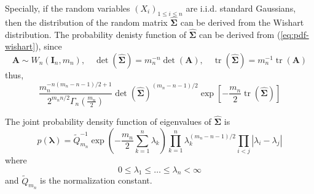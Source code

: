 Specially, if the random variables $\left(X_{i}\right)_{1\leq i\leq n}$ are i.i.d. standard Gaussians, then the distribution of the random matrix $\widehat{\boldsymbol{\Sigma}}$ can be derived from the Wishart distribution. The probability denisty function of $\widehat{\boldsymbol{\Sigma}}$ can be derived from (\ref{eq:pdf-wishart}), since
\begin{equation*}
    \mathbf{A}\sim W_{n}\left(\mathbf{I}_{n},m_{n}\right),\quad\operatorname{det}\left(\widehat{\boldsymbol{\Sigma}}\right)=m_{n}^{-n}\operatorname{det}\left(\mathbf{A}\right),\quad\operatorname{tr}\left(\widehat{\boldsymbol{\Sigma}}\right)=m_{n}^{-1}\operatorname{tr}\left(\mathbf{A}\right)
\end{equation*}
thus,
\begin{equation}
    \frac{m_{n}^{-n(m_{n}-n-1)/2+1}}{2^{m_{n}n/2}\Gamma_{n}\left(\frac{m_{n}}{2}\right)}\operatorname{det}\left(\widehat{\boldsymbol{\Sigma}}\right)^{(m_{n}-n-1)/2}\exp\left[-\frac{m_{n}}{2}\operatorname{tr}\left(\widehat{\boldsymbol{\Sigma}}\right)\right]
\end{equation}

\begin{theorem}
    The joint probability density function of eigenvalues of $\widehat{\boldsymbol{\Sigma}}$ is
    \begin{equation}
        p\left(\boldsymbol{\lambda}\right)=\widetilde{Q}_{m_{n}}^{-1}\exp\left(-\frac{m_{n}}{2}\sum_{k=1}^{n}\lambda_{k}\right)\prod_{k=1}^{n}\lambda_{k}^{(m_{n}-n-1)/2}\prod_{i<j}\left|\lambda_{i}-\lambda_{j}\right|
        \label{eq:jpdf-eigenvalues-sigma}
    \end{equation}
    where
    \begin{equation*}
        0\leq\lambda_{1}\leq\ldots\leq\lambda_{n}<\infty
    \end{equation*}
    and $\widetilde{Q}_{m_{n}}$ is the normalization constant.
\end{theorem}

